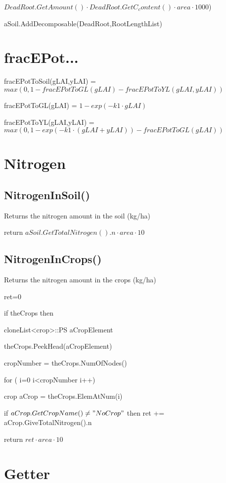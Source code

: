 \documentclass[%
]{scrartcl}
\begin{document}
{{{$DeadRoot.GetAmount() \cdot DeadRoot.GetC_content() \cdot area \cdot 1000$)

   aSoil.AddDecomposable(DeadRoot,RootLengthList)



\section{fracEPot...}

fracEPotToSoil(gLAI,yLAI) = 
    $max(0,1-fracEPotToGL(gLAI)-fracEPotToYL(gLAI,yLAI))$

fracEPotToGL(gLAI) =  $1-exp(-k1 \cdot gLAI)$

fracEPotToYL(gLAI,yLAI) = 
$max(0,1-exp(-k1 \cdot (gLAI+yLAI))-fracEPotToGL(gLAI))$




\section{Nitrogen}

\subsection{NitrogenInSoil()}	
Returns the nitrogen amount in the soil (kg/ha)
     
  return $aSoil.GetTotalNitrogen().n \cdot area \cdot 10$
  
   

\subsection{NitrogenInCrops()}	
Returns the nitrogen amount in the crops (kg/ha)

     ret=0

   if theCrops then
    
  cloneList<crop>::PS aCropElement
   	
theCrops.PeekHead(aCropElement)
	  
  cropNumber = theCrops.NumOfNodes()
  
   	for ( i=0 i<cropNumber i++)
	  
   	
\quad	crop    aCrop = theCrops.ElemAtNum(i)
      
\quad	if $aCrop.GetCropName()\ne "NoCrop"$ then
            ret += aCrop.GiveTotalNitrogen().n
      
  
  return $ ret \cdot area \cdot 10 $
  



\section{Getter}

}}}
\end{document}
